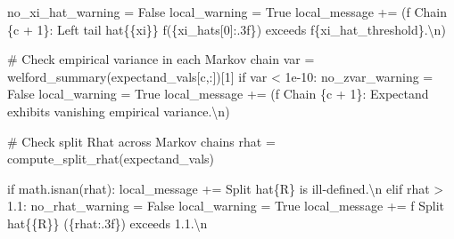 \documentclass[
  letterpaper,
  DIV=11,
  numbers=noendperiod]{scrartcl}
\newenvironment{Shaded}{\begin{snugshade}}{\end{snugshade}}
\newcommand{\CharTok}[1]{\textcolor[rgb]{0.13,0.47,0.30}{#1}}
\newcommand{\CommentTok}[1]{\textcolor[rgb]{0.37,0.37,0.37}{#1}}
\newcommand{\ControlFlowTok}[1]{\textcolor[rgb]{0.00,0.23,0.31}{#1}}
\newcommand{\DecValTok}[1]{\textcolor[rgb]{0.68,0.00,0.00}{#1}}
\newcommand{\FloatTok}[1]{\textcolor[rgb]{0.68,0.00,0.00}{#1}}
\newcommand{\NormalTok}[1]{\textcolor[rgb]{0.00,0.23,0.31}{#1}}
\newcommand{\OperatorTok}[1]{\textcolor[rgb]{0.37,0.37,0.37}{#1}}
\newcommand{\SpecialCharTok}[1]{\textcolor[rgb]{0.37,0.37,0.37}{#1}}
\newcommand{\SpecialStringTok}[1]{\textcolor[rgb]{0.13,0.47,0.30}{#1}}
\newcommand{\StringTok}[1]{\textcolor[rgb]{0.13,0.47,0.30}{#1}}
\newcommand{\VariableTok}[1]{\textcolor[rgb]{0.07,0.07,0.07}{#1}}
\begin{document}
\begin{Shaded}
\begin{Highlighting}[]
\NormalTok{        no\_xi\_hat\_warning }\OperatorTok{=} \VariableTok{False}
\NormalTok{        local\_warning }\OperatorTok{=} \VariableTok{True}
\NormalTok{        local\_message }\OperatorTok{+=}\NormalTok{ (}\SpecialStringTok{f\textquotesingle{}  Chain }\SpecialCharTok{\{}\NormalTok{c }\OperatorTok{+} \DecValTok{1}\SpecialCharTok{\}}\SpecialStringTok{: Left tail hat}\CharTok{\{\{}\SpecialStringTok{xi}\CharTok{\}\}}\SpecialStringTok{ \textquotesingle{}}
                          \SpecialStringTok{f\textquotesingle{}(}\SpecialCharTok{\{}\NormalTok{xi\_hats[}\DecValTok{0}\NormalTok{]}\SpecialCharTok{:.3f\}}\SpecialStringTok{) exceeds \textquotesingle{}}
                          \SpecialStringTok{f\textquotesingle{}}\SpecialCharTok{\{}\NormalTok{xi\_hat\_threshold}\SpecialCharTok{\}}\SpecialStringTok{.}\CharTok{\textbackslash{}n}\SpecialStringTok{\textquotesingle{}}\NormalTok{)}

      \CommentTok{\# Check empirical variance in each Markov chain}
\NormalTok{      var }\OperatorTok{=}\NormalTok{ welford\_summary(expectand\_vals[c,:])[}\DecValTok{1}\NormalTok{]}
      \ControlFlowTok{if}\NormalTok{ var }\OperatorTok{\textless{}} \FloatTok{1e{-}10}\NormalTok{:}
\NormalTok{        no\_zvar\_warning }\OperatorTok{=} \VariableTok{False}
\NormalTok{        local\_warning }\OperatorTok{=} \VariableTok{True}
\NormalTok{        local\_message }\OperatorTok{+=}\NormalTok{ (}\SpecialStringTok{f\textquotesingle{}  Chain }\SpecialCharTok{\{}\NormalTok{c }\OperatorTok{+} \DecValTok{1}\SpecialCharTok{\}}\SpecialStringTok{: Expectand exhibits \textquotesingle{}}
                          \StringTok{\textquotesingle{}vanishing empirical variance.}\CharTok{\textbackslash{}n}\StringTok{\textquotesingle{}}\NormalTok{)}

    \CommentTok{\# Check split Rhat across Markov chains}
\NormalTok{    rhat }\OperatorTok{=}\NormalTok{ compute\_split\_rhat(expectand\_vals)}

    \ControlFlowTok{if}\NormalTok{ math.isnan(rhat):}
\NormalTok{      local\_message }\OperatorTok{+=} \StringTok{\textquotesingle{}  Split hat}\SpecialCharTok{\{R\}}\StringTok{ is ill{-}defined.}\CharTok{\textbackslash{}n}\StringTok{\textquotesingle{}}
    \ControlFlowTok{elif}\NormalTok{ rhat }\OperatorTok{\textgreater{}} \FloatTok{1.1}\NormalTok{:}
\NormalTok{      no\_rhat\_warning }\OperatorTok{=} \VariableTok{False}
\NormalTok{      local\_warning }\OperatorTok{=} \VariableTok{True}
\NormalTok{      local\_message }\OperatorTok{+=} \SpecialStringTok{f\textquotesingle{}  Split hat}\CharTok{\{\{}\SpecialStringTok{R}\CharTok{\}\}}\SpecialStringTok{ (}\SpecialCharTok{\{}\NormalTok{rhat}\SpecialCharTok{:.3f\}}\SpecialStringTok{) exceeds 1.1.}\CharTok{\textbackslash{}n}\SpecialStringTok{\textquotesingle{}}


\end{Highlighting}
\end{Shaded}
\end{document}
